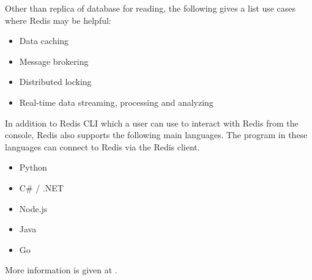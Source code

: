Other than replica of database for reading, the following gives a list use cases where Redis may be helpful:
\begin{itemize}
	\item Data caching
	\item Message brokering
	\item Distributed locking
	\item Real-time data streaming, processing and analyzing
\end{itemize}

In addition to Redis CLI which a user can use to interact with Redis from the console, Redis also supports the following main languages. The program in these languages can connect to Redis via the Redis client.
\begin{itemize}
\item Python
\item C\# / .NET
\item Node.js
\item Java
\item Go
\end{itemize}
More information is given at \cite{redis2024client}.





